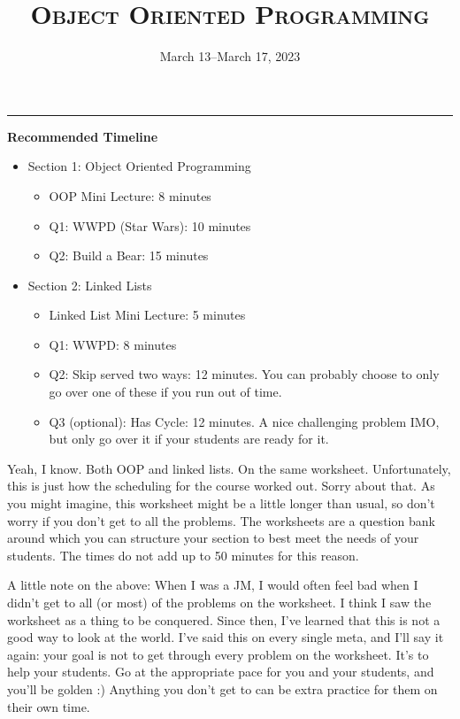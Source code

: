 \documentclass{exam}
\title{\textsc{Object Oriented Programming}}
\date{March 13--March 17, 2023}
\begin{document}
	\maketitle
	\rule{\textwidth}{0.15em}
	\fontsize{12}{15}\selectfont

\begin{meta}
	\textbf{Recommended Timeline}
	\begin{itemize}
		\item Section 1: Object Oriented Programming
		\begin{itemize}
		\item OOP Mini Lecture: 8 minutes
		\item Q1: WWPD (Star Wars): 10 minutes
		\item Q2: Build a Bear: 15 minutes
		\end{itemize}
		\item Section 2: Linked Lists
		\begin{itemize}
			\item Linked List Mini Lecture: 5 minutes
			\item Q1: WWPD: 8 minutes
			\item Q2: Skip served two ways: 12 minutes. You can probably choose to only go over one of these if you run out of time. 
			\item Q3 (optional): Has Cycle: 12 minutes. A nice challenging problem IMO, but only go over it if your students are ready for it. 
		\end{itemize}
	\end{itemize}
Yeah, I know. Both OOP and linked lists. On the same worksheet. Unfortunately, this is just how the scheduling for the course worked out. Sorry about that. As you might imagine, this worksheet might be a little longer than usual, so don't worry if you don't get to all the problems. The worksheets are a question bank around which you can structure your section to best meet the needs of your students. The times do not add up to 50 minutes for this reason. 

A little note on the above: When I was a JM, I would often feel bad when I didn't get to all (or most) of the problems on the worksheet. I think I saw the worksheet as a thing to be conquered. Since then, I've learned that this is not a good way to look at the world. I've said this on every single meta, and I'll say it again: your goal is not to get through every problem on the worksheet. It's to help your students. Go at the appropriate pace for you and your students, and you'll be golden :) Anything you don't get to can be extra practice for them on their own time. 


\end{meta}
\end{document}
